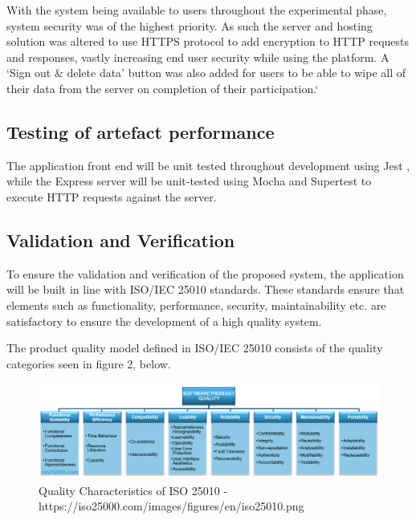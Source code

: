 \documentclass[lettersize,journal]{IEEEtran}
\begin{document}
	With the system being available to users throughout the experimental phase, system security was of the highest priority. As such the server and hosting solution was altered to use HTTPS protocol
	 to add encryption to HTTP requests and responses, vastly increasing end user security while using the platform. 
	 A `Sign out \& delete data' button was also added for users to be able to wipe all of their data from the server on completion of their participation.`
       
       \subsection{Testing of artefact performance}
        The application front end will be unit tested throughout development using Jest \cite{Jest}, while the Express server will be unit-tested using Mocha \cite{Mocha}
        and Supertest \cite{SuperTest} to execute HTTP requests against the server.

        \subsection{Validation and Verification}

        To ensure the validation and verification of the proposed system, the application will be built in line with ISO/IEC 25010 \cite{ISO25000} standards.
        These standards ensure that elements such as functionality, performance, security, maintainability etc. are satisfactory to ensure the development of a high quality system.

        The product quality model defined in ISO/IEC 25010 consists of the quality categories seen in figure 2, below.

        \begin{figure}[h!]
                \includegraphics[width=\linewidth]{iso.png}
                \caption{Quality Characteristics of ISO 25010 - https://iso25000.com/images/figures/en/iso25010.png}
                \label{figure 2}
        \end{figure}
\end{document}
